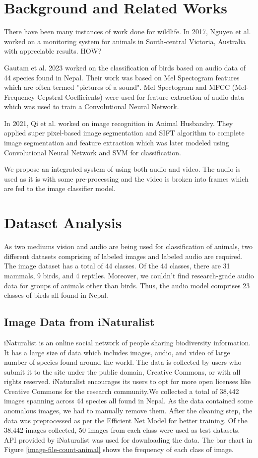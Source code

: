 \documentclass[fleqn, 10pt, twoside]{IOEGC}
\begin{document}
\section{Background and Related Works}
There have been many instances of work done for wildlife. In 2017, Nguyen et al.\cite{r4} worked on a monitoring system for animals in South-central Victoria, Australia with appreciable results. HOW?
\par
Gautam et al. 2023 \cite{r5} worked on the classification of birds based on audio data of 44 species found in Nepal. Their work was based on Mel Spectogram features which are often termed "pictures of a sound". Mel Spectogram and MFCC (Mel-Frequency Cepstral Coefficients) were used for feature extraction of audio data which was used to train a Convolutional Neural Network.
\par
In 2021, Qi et al. \cite{r6} worked on image recognition in Animal Husbandry. They applied super pixel-based image segmentation and SIFT algorithm to complete image segmentation and feature extraction which was later modeled using Convolutional Neural Network and SVM for classification.
\par
We propose an integrated system of using both audio and video. The audio is used as it is with some pre-processing and the video is broken into frames which are fed to the image classifier model.

\section{Dataset Analysis}
As two mediums vision and audio are being used for classification of animals, two different datasets comprising of labeled images and labeled audio are required.
The image dataset has a total of 44 classes. Of the 44 classes, there are 31 mammals, 9 birds, and 4 reptiles. Moreover, we couldn’t find research-grade audio data for groups of animals other than birds. Thus, the audio model comprises 23 classes of birds all found in Nepal.
\subsection{Image Data from iNaturalist}
iNaturalist is an online social network of people sharing biodiversity information. It has a large size of data which includes images, audio, and video of large number of species found around the world. The data is collected by users who submit it to the site under the public domain, Creative Commons, or with all rights reserved. iNaturalist encourages its users to opt for more open licenses like Creative Commons for the research community.We collected a total of 38,442 images spanning across 44 species all found in Nepal. As the data contained some anomalous images, we had to manually remove them. After the cleaning step, the data was preprocessed as per the Efficient Net Model for better training. Of the 38,442 images collected, 50 images from each class were used as test datasets.
API provided by iNaturalist was used for downloading the data. The bar chart in Figure \ref{image-file-count-animal} shows the frequency of each class of image.
\end{document}
